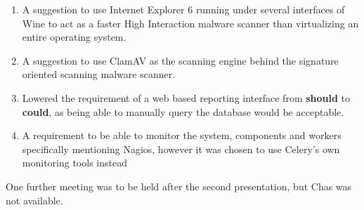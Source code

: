 \begin{enumerate}
    \item A suggestion to use Internet Explorer 6 running under several interfaces of Wine to act as a faster High Interaction malware scanner than virtualizing an entire operating system.

    \item A suggestion to use ClamAV as the scanning engine behind the signature oriented scanning malware scanner.

    \item Lowered the requirement of a web based reporting interface from \textbf{should} to \textbf{could}, as being able to manually query the database would be acceptable.

    \item A requirement to be able to monitor the system, components and workers specifically mentioning Nagios, however it was chosen to use Celery's own monitoring tools instead
\end{enumerate}

One further meeting was to be held after the second presentation, but Chas was not available.

